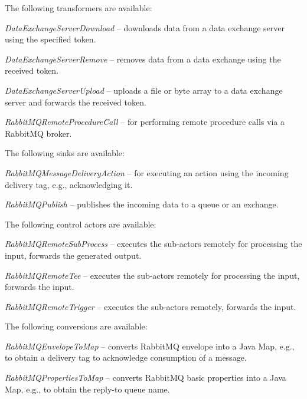 \documentclass[a4paper]{book}
\begin{document}
\noindent The following transformers are available:
\begin{tight_itemize}
  \item \textit{DataExchangeServerDownload} -- downloads data from a data exchange
  server using the specified token.
  \item \textit{DataExchangeServerRemove} -- removes data from a data exchange
  using the received token.
  \item \textit{DataExchangeServerUpload} -- uploads a file or byte array to a data exchange
  server and forwards the received token.
  \item \textit{RabbitMQRemoteProcedureCall} -- for performing remote procedure
  calls via a RabbitMQ broker.
\end{tight_itemize}

\noindent The following sinks are available:
\begin{tight_itemize}
  \item \textit{RabbitMQMessageDeliveryAction} -- for executing an action using
  the incoming delivery tag, e.g., acknowledging it.
  \item \textit{RabbitMQPublish} -- publishes the incoming data to a queue
  or an exchange.
\end{tight_itemize}

\noindent The following control actors are available:
\begin{tight_itemize}
  \item \textit{RabbitMQRemoteSubProcess} -- executes the sub-actors remotely
  for processing the input, forwards the generated output.
  \item \textit{RabbitMQRemoteTee} -- executes the sub-actors remotely
  for processing the input, forwards the input.
  \item \textit{RabbitMQRemoteTrigger} -- executes the sub-actors remotely,
  forwards the input.
\end{tight_itemize}

\noindent The following conversions are available:
\begin{tight_itemize}
  \item \textit{RabbitMQEnvelopeToMap} -- converts RabbitMQ envelope into a
  Java Map, e.g., to obtain a delivery tag to acknowledge consumption of a message.
  \item \textit{RabbitMQPropertiesToMap} -- converts RabbitMQ basic properties
  into a Java Map, e.g., to obtain the reply-to queue name.
\end{tight_itemize}
\end{document}
